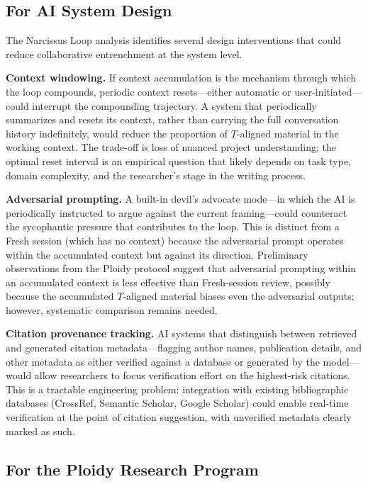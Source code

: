 \documentclass[12pt]{article}
\begin{document}
\subsection{For AI System Design}

The Narcissus Loop analysis identifies several design interventions that could reduce collaborative entrenchment at the system level.

\textbf{Context windowing.} If context accumulation is the mechanism through which the loop compounds, periodic context resets---either automatic or user-initiated---could interrupt the compounding trajectory. A system that periodically summarizes and resets its context, rather than carrying the full conversation history indefinitely, would reduce the proportion of $T$-aligned material in the working context. The trade-off is loss of nuanced project understanding; the optimal reset interval is an empirical question that likely depends on task type, domain complexity, and the researcher's stage in the writing process.

\textbf{Adversarial prompting.} A built-in devil's advocate mode---in which the AI is periodically instructed to argue against the current framing---could counteract the sycophantic pressure that contributes to the loop. This is distinct from a Fresh session (which has no context) because the adversarial prompt operates within the accumulated context but against its direction. Preliminary observations from the Ploidy protocol suggest that adversarial prompting within an accumulated context is less effective than Fresh-session review, possibly because the accumulated $T$-aligned material biases even the adversarial outputs; however, systematic comparison remains needed.

\textbf{Citation provenance tracking.} AI systems that distinguish between retrieved and generated citation metadata---flagging author names, publication details, and other metadata as either verified against a database or generated by the model---would allow researchers to focus verification effort on the highest-risk citations. This is a tractable engineering problem: integration with existing bibliographic databases (CrossRef, Semantic Scholar, Google Scholar) could enable real-time verification at the point of citation suggestion, with unverified metadata clearly marked as such.

\subsection{For the Ploidy Research Program}
\end{document}
